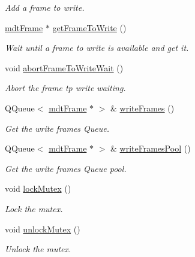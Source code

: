 \begin{DoxyCompactItemize}
\begin{DoxyCompactList}\small\item\em Add a frame to write. \end{DoxyCompactList}\item 
\hyperlink{classmdt_frame}{mdtFrame} $\ast$ \hyperlink{classmdt_abstract_port_a6c5ebd4451aec959efc4e71ab1b13941}{getFrameToWrite} ()
\begin{DoxyCompactList}\small\item\em Wait until a frame to write is available and get it. \end{DoxyCompactList}\item 
void \hyperlink{classmdt_abstract_port_ae67c815f68317c70e398eaa86622af6b}{abortFrameToWriteWait} ()
\begin{DoxyCompactList}\small\item\em Abort the frame tp write waiting. \end{DoxyCompactList}\item 
QQueue$<$ \hyperlink{classmdt_frame}{mdtFrame} $\ast$ $>$ \& \hyperlink{classmdt_abstract_port_a4fed10be147dfce6ca315467ff3fb968}{writeFrames} ()
\begin{DoxyCompactList}\small\item\em Get the write frames Queue. \end{DoxyCompactList}\item 
QQueue$<$ \hyperlink{classmdt_frame}{mdtFrame} $\ast$ $>$ \& \hyperlink{classmdt_abstract_port_abf093b67fddebffa4f3c52277b9a8cf7}{writeFramesPool} ()
\begin{DoxyCompactList}\small\item\em Get the write frames Queue pool. \end{DoxyCompactList}\item 
\hypertarget{classmdt_abstract_port_a6bf2ecdcf894da3929a22eb8793a9fe3}{
void \hyperlink{classmdt_abstract_port_a6bf2ecdcf894da3929a22eb8793a9fe3}{lockMutex} ()}
\label{classmdt_abstract_port_a6bf2ecdcf894da3929a22eb8793a9fe3}

\begin{DoxyCompactList}\small\item\em Lock the mutex. \end{DoxyCompactList}\item 
\hypertarget{classmdt_abstract_port_a3523c72a06e4d950338f91e56c286e84}{
void \hyperlink{classmdt_abstract_port_a3523c72a06e4d950338f91e56c286e84}{unlockMutex} ()}
\label{classmdt_abstract_port_a3523c72a06e4d950338f91e56c286e84}

\begin{DoxyCompactList}\small\item\em Unlock the mutex. \end{DoxyCompactList}\end{DoxyCompactItemize}
